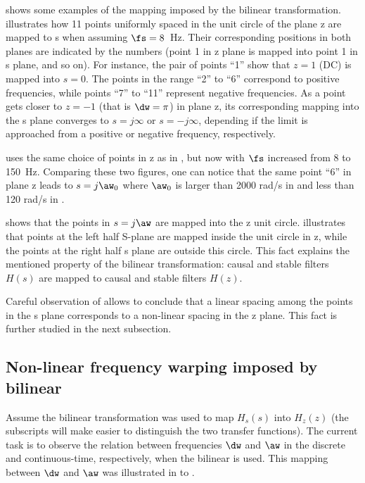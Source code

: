  shows some examples of the mapping imposed by the bilinear transformation.  illustrates how 11 points uniformly spaced in the unit circle of the plane z are mapped to s when assuming $\fs = 8$~Hz. Their corresponding positions in both planes are indicated by the numbers (point 1 in z plane is mapped into point 1 in s plane, and so on). For instance, the pair of points ``1'' show that $z=1$ (DC) is mapped into $s=0$. The points in the range ``2'' to ``6'' correspond to positive frequencies, while points ``7'' to ``11'' represent negative frequencies. As a point gets closer to $z=-1$ (that is $\dw=\pi$) in plane z, its corresponding mapping into the s plane converges to $s=j\infty$ or $s=-j\infty$, depending if the limit is approached from a positive or negative frequency, respectively.

 uses the same choice of points in z as in , but now with $\fs$ increased from $8$ to 150~Hz. Comparing these two figures, one can notice that the same point ``6'' in plane z leads to $s=j \aw_0$ where $\aw_0$ is larger than 2000 rad/s in  and less than 120 rad/s in .

 shows that the points in $s=j\aw$ are mapped into the z unit circle.  illustrates that points at the left half S-plane are mapped inside the unit circle in z, while the points at the right half s plane are outside this circle. This fact explains the mentioned property of the bilinear transformation: causal and stable filters $H(s)$ are mapped to causal and stable filters $H(z)$.

Careful observation of  allows to conclude that a linear spacing among the points in the s plane corresponds to a non-linear spacing in the z plane. This fact is further studied in the next subsection.

\subsection{Non-linear frequency warping imposed by bilinear}

Assume the bilinear transformation was used to map $H_s(s)$ into $H_z(z)$ (the subscripts will make easier to distinguish the two transfer functions). The current task is to observe the relation between frequencies $\dw$ and $\aw$ in the discrete and continuous-time, respectively, when the bilinear is used. This mapping between $\dw$ and $\aw$ was illustrated in  to .

